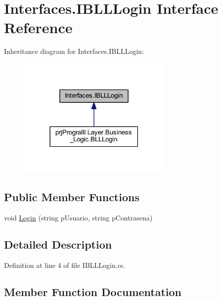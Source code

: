 \hypertarget{interface_interfaces_1_1_i_b_l_l_login}{}\section{Interfaces.\+I\+B\+L\+L\+Login Interface Reference}
\label{interface_interfaces_1_1_i_b_l_l_login}


Inheritance diagram for Interfaces.\+I\+B\+L\+L\+Login\+:
\nopagebreak
\begin{figure}[H]
\begin{center}
\leavevmode
\includegraphics[width=213pt]{interface_interfaces_1_1_i_b_l_l_login__inherit__graph}
\end{center}
\end{figure}
\subsection*{Public Member Functions}
\begin{DoxyCompactItemize}
\item 
void \hyperlink{interface_interfaces_1_1_i_b_l_l_login_a809da754cba4a38c15fd18a7bd9cb95a}{Login} (string p\+Usuario, string p\+Contrasena)
\end{DoxyCompactItemize}


\subsection{Detailed Description}


Definition at line 4 of file I\+B\+L\+L\+Login.\+cs.



\subsection{Member Function Documentation}
\hypertarget{interface_interfaces_1_1_i_b_l_l_login_a809da754cba4a38c15fd18a7bd9cb95a}{}\label{interface_interfaces_1_1_i_b_l_l_login_a809da754cba4a38c15fd18a7bd9cb95a} 
